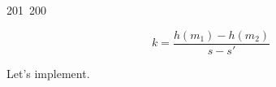 201~200~\documentclass{article}
\begin{document}
	                                                                        	                                                                    	                                	                    	                    	                        	                        	                    	                                                                	                	                                                                    	                    							                                                                                                                                                                                                    		                                                                                                                        				    		\[
	                                                                        	                                                                    	                                	                    	                    	                        	                        	                    	                                                                	                	                                                                    	                    							                                                                                                                                                                                                    		                                                                                                                        				    			k = \frac{h(m_1) - h(m_2)}{s-s'}
	                                                                        	                                                                    	                                	                    	                    	                        	                        	                    	                                                                	                	                                                                    	                    							                                                                                                                                                                                                    		                                                                                                                        				    			\]

	                                                                        	                                                                    	                                	                    	                    	                        	                        	                    	                                                                	                	                                                                    	                    							                                                                                                                                                                                                    		                                                                                                                        				    			Let's implement.
\end{document}
